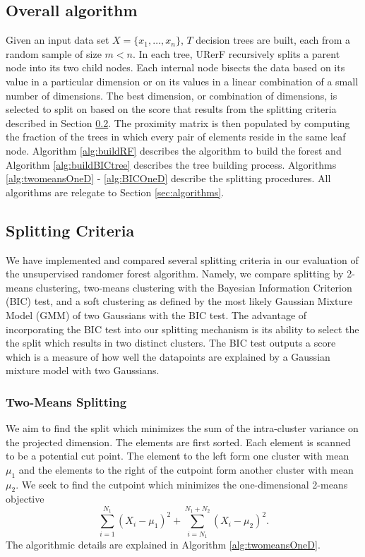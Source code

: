 \subsection{Overall algorithm} \label{overall}

 
Given an input data set $X=\{x_1,\ldots, x_n\}$, $T$ decision trees are built, each from a random sample of size $m<n$. In each tree, URerF recursively splits a parent node into its two child nodes. Each internal node bisects the data based on its value in a particular dimension or on its values in a linear combination of a small number of dimensions. The best dimension, or combination of dimensions, is selected to split on based on the score that results from the splitting criteria described in Section \ref{split}. The proximity matrix is then populated by computing the fraction of the trees in which every pair of elements reside in the same leaf node. Algorithm \ref{alg:buildRF} describes the algorithm to build the forest and Algorithm \ref{alg:buildBICtree} describes the tree building process. Algorithms \ref{alg:twomeansOneD} - \ref{alg:BICOneD} describe the splitting procedures. All algorithms are relegate to Section \ref{sec:algorithms}. 

 
\subsection{Splitting Criteria} \label{split}
We have implemented and compared several splitting criteria in our evaluation of the unsupervised randomer forest algorithm.
Namely, we compare splitting by 2-means
clustering, two-means clustering with the Bayesian Information Criterion (BIC) test,
and a soft clustering as defined by the 
most likely Gaussian Mixture Model (GMM) of two Gaussians with the BIC test.
The advantage of incorporating the BIC test
into our splitting mechanism is its ability
to select the the split which results in two distinct clusters. The BIC test outputs a score which is a measure of how well the datapoints are explained by a Gaussian mixture model with two Gaussians.


\subsubsection{Two-Means Splitting} 
We aim to find the split which minimizes the sum of the intra-cluster variance on the projected dimension. The elements are first sorted. Each element is scanned to be a potential cut point. The element to the left form one cluster with mean $\mu_1$ and the elements to the right of the cutpoint form another cluster with mean $\mu_2$. We seek to find the cutpoint which minimizes the one-dimensional 2-means objective $$\sum_{i=1}^{N_1} (X_i - \mu_1)^2 + \sum_{i=N_1}^{N_1+N_2} (X_i - \mu_2)^2 .$$ The algorithmic details are explained in Algorithm \ref{alg:twomeansOneD}.





